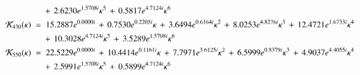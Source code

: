 \begin{align}
	&\quad\, + \, 2.6230  e^{1.5708 i} \kappa ^ 5\, + \, 0.5817  e^{4.7124 i} \kappa ^ 6 \\ 
	\label{eq:cw_fit_8}
	\mathcal{K}_{430}(\kappa) \; &= \;15.2887 e^{0.0000 i}\, + \, 0.7530  e^{0.2205 i} \kappa\, + \, 3.6494  e^{0.6164 i} \kappa ^ 2\, + \, 8.0253  e^{4.8276 i} \kappa ^ 3\, + \, 12.4721  e^{1.6733 i} \kappa ^ 4\\ \nonumber
	&\quad\, + \, 10.3028  e^{4.7124 i} \kappa ^ 5\, + \, 3.5289  e^{1.5708 i} \kappa ^ 6 \\ 
	\label{eq:cw_fit_9}
	\mathcal{K}_{550}(\kappa) \; &= \;22.5229 e^{0.0000 i}\, + \, 10.4414  e^{0.1161 i} \kappa\, + \, 7.7971  e^{3.6125 i} \kappa ^ 2\, + \, 6.5999  e^{0.8379 i} \kappa ^ 3\, + \, 4.9037  e^{4.4055 i} \kappa ^ 4\\ \nonumber
	&\quad\, + \, 2.5991  e^{1.5708 i} \kappa ^ 5\, + \, 0.5899  e^{4.7124 i} \kappa ^ 6
\end{align}
